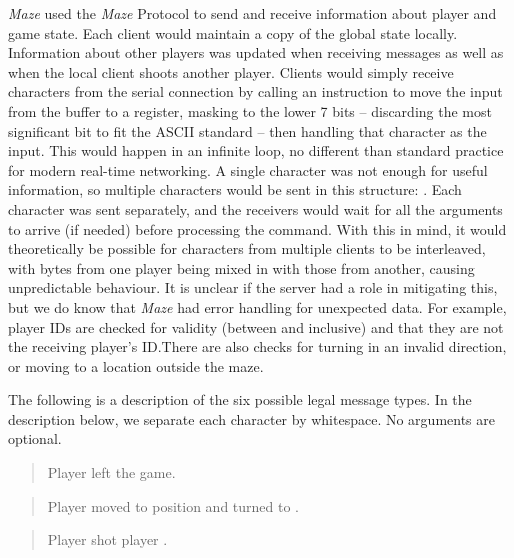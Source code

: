\textit{Maze} used the \textit{Maze} Protocol to send and receive information about player and game state. Each client would maintain a copy of the global state locally. Information about other players was updated when receiving messages as well as when the local client shoots another player. Clients would simply receive characters from the serial connection by calling an instruction to move the input from the buffer to a register, masking to the lower 7 bits -- discarding the most significant bit to fit the ASCII standard -- then handling that character as the input. This would happen in an infinite loop, no different than standard practice for modern real-time networking. A single character was not enough for useful information, so multiple characters would be sent in this structure: . Each character was sent separately, and the receivers would wait for all the arguments to arrive (if needed) before processing the command. With this in mind, it would theoretically be possible for characters from multiple clients to be interleaved, with bytes from one player being mixed in with those from another, causing unpredictable behaviour. It is unclear if the server had a role in mitigating this, but we do know that \textit{Maze} had error handling for unexpected data. For example, player IDs are checked for validity (between  and  inclusive) and that they are not the receiving player's ID.\@ There are also checks for turning in an invalid direction, or moving to a location outside the maze.

The following is a description of the six possible legal message types. In the description below, we separate each character by whitespace. No arguments are optional.~\cite{mazesrc}

\begin{quote}

  Player  left the game.
\end{quote}

\begin{quote}

  Player  moved to position  and turned to .
\end{quote}

\begin{quote}

  Player  shot player .
\end{quote}

